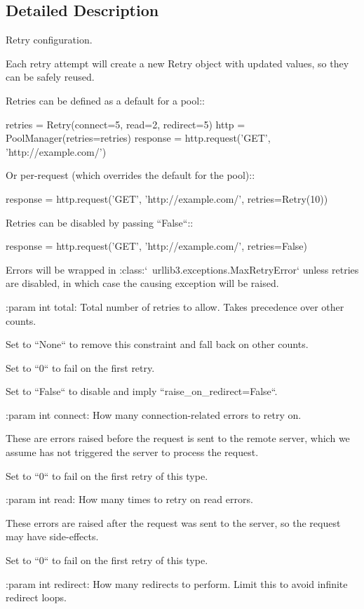 \subsection{Detailed Description}
\begin{DoxyVerb}Retry configuration.

Each retry attempt will create a new Retry object with updated values, so
they can be safely reused.

Retries can be defined as a default for a pool::

    retries = Retry(connect=5, read=2, redirect=5)
    http = PoolManager(retries=retries)
    response = http.request('GET', 'http://example.com/')

Or per-request (which overrides the default for the pool)::

    response = http.request('GET', 'http://example.com/', retries=Retry(10))

Retries can be disabled by passing ``False``::

    response = http.request('GET', 'http://example.com/', retries=False)

Errors will be wrapped in :class:`~urllib3.exceptions.MaxRetryError` unless
retries are disabled, in which case the causing exception will be raised.

:param int total:
    Total number of retries to allow. Takes precedence over other counts.

    Set to ``None`` to remove this constraint and fall back on other
    counts.

    Set to ``0`` to fail on the first retry.

    Set to ``False`` to disable and imply ``raise_on_redirect=False``.

:param int connect:
    How many connection-related errors to retry on.

    These are errors raised before the request is sent to the remote server,
    which we assume has not triggered the server to process the request.

    Set to ``0`` to fail on the first retry of this type.

:param int read:
    How many times to retry on read errors.

    These errors are raised after the request was sent to the server, so the
    request may have side-effects.

    Set to ``0`` to fail on the first retry of this type.

:param int redirect:
    How many redirects to perform. Limit this to avoid infinite redirect
    loops.


\end{DoxyVerb}

